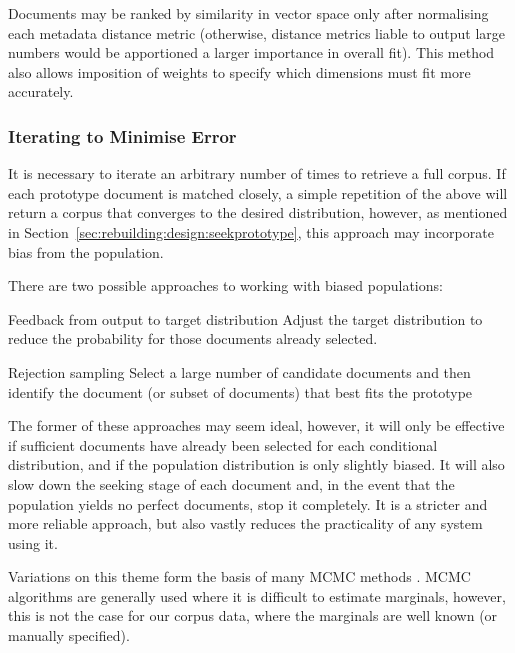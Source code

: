 Documents may be ranked by similarity in vector space only after normalising each metadata distance metric (otherwise, distance metrics liable to output large numbers would be apportioned a larger importance in overall fit).  This method also allows imposition of weights to specify which dimensions must fit more accurately.


\subsubsection{Iterating to Minimise Error}
\label{sec:rebuilding:design:minerr}
It is necessary to iterate an arbitrary number of times to retrieve a full corpus.  If each prototype document is matched closely, a simple repetition of the above will return a corpus that converges to the desired distribution, however, as mentioned in Section~\ref{sec:rebuilding:design:seekprototype}, this approach may incorporate bias from the population.

There are two possible approaches to working with biased populations:

\begin{itemizeTitle}
    \item[Feedback from output to target distribution] Adjust the target distribution to reduce the probability for those documents already selected.
    \item[Rejection sampling]  Select a large number of candidate documents and then identify the document (or subset of documents) that best fits the prototype
\end{itemizeTitle}

The former of these approaches may seem ideal, however, it will only be effective if sufficient documents have already been selected for each conditional distribution, and if the population distribution is only slightly biased.  It will also slow down the seeking stage of each document and, in the event that the population yields no perfect documents, stop it completely.  It is a stricter and more reliable approach, but also vastly reduces the practicality of any system using it.

Variations on this theme form the basis of many MCMC methods%
.  MCMC algorithms are generally used where it is difficult to estimate marginals, however, this is not the case for our corpus data, where the marginals are well known (or manually specified).


